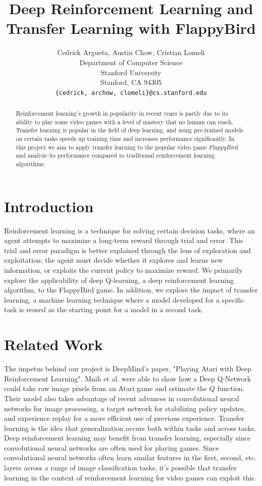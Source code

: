 \documentclass{article}
\title{Deep Reinforcement Learning and Transfer Learning with FlappyBird}
\author{
  Cedrick Argueta, Austin Chow, Cristian Lomeli \\
  Department of Computer Science\\
  Stanford University\\
  Stanford, CA 94305 \\
  \texttt{\{cedrick, archow, clomeli\}@cs.stanford.edu} \\
}
\begin{document}

\maketitle

\begin{abstract}

Reinforcement learning's growth in popularity in recent years is partly due to its ability to play some video games with a level of mastery that no human can reach. 
Transfer learning is popular in the field of deep learning, and using pre-trained models on certain tasks speeds up training time and increases performance significantly. 
In this project we aim to apply transfer learning to the popular video game \textit{FlappyBird} and analyze its performance compared to traditional reinforcement learning algorithms.
 
\end{abstract}


\section{Introduction}
Reinforcement learning is a technique for solving certain decision tasks, where an agent attempts to maximize a long-term reward through trial and error. 
This trial and error paradigm is better explained through the lens of exploration and exploitation: the agent must decide whether it explores and learns new information, or exploits the current policy to maximize reward.
We primarily explore the applicability of deep Q-learning, a deep reinforcement learning algorithm, to the FlappyBird game.
In addition, we explore the impact of transfer learning, a machine learning technique where a model developed for a specific task is reused as the starting point for a model in a second task.

\section{Related Work}
The impetus behind our project is DeepMind's paper, "Playing Atari with Deep Reinforcement Learning". Mnih et al. were able to show how a Deep Q-Network could take raw image pixels from an Atari game and estimate the $Q$ function. \cite{deepmind}
Their model also takes advantage of recent advances in convolutional neural networks for image processing, a target network for stabilizing policy updates, and experience replay for a more efficient use of previous experience.
Transfer learning is the idea that generalization occurs both within tasks and across tasks. \cite{transfer}
Deep reinforcement learning may benefit from transfer learning, especially since convolutional neural networks are often used for playing games.
Since convolutional neural networks often learn similar features in the first, second, etc. layers across a range of image classification tasks, it's possible that transfer learning in the context of reinforcement learning for video games can exploit this.
\end{document}
